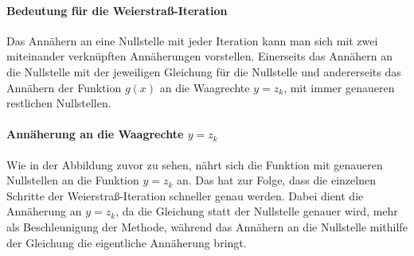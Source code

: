 \documentclass[12pt]{article}
\begin{document}
\paragraph{Bedeutung für die Weierstraß-Iteration}
Das Annähern an eine Nullstelle mit jeder Iteration kann man sich mit zwei miteinander verknüpften Annäherungen vorstellen. Einerseits das Annähern an die Nullstelle mit der jeweiligen Gleichung für die Nullstelle und andererseits das Annähern der Funktion $g(x)$ an die Waagrechte $y=z_k$, mit immer genaueren restlichen Nullstellen.

\paragraph{Annäherung an die Waagrechte $y=z_k$}
Wie in der Abbildung zuvor zu sehen, nährt sich die Funktion mit genaueren Nullstellen an die Funktion $y=z_k$ an. Das hat zur Folge, dass die einzelnen Schritte der Weierstraß-Iteration schneller genau werden.
Dabei dient die Annäherung an $y=z_k$, da die Gleichung statt der Nullstelle genauer wird, mehr als Beschleunigung der Methode, während das Annähern an die Nullstelle mithilfe der Gleichung die eigentliche Annäherung bringt.
\end{document}
